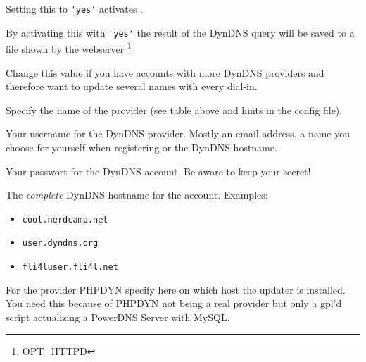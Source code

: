 \begin{description}


    {Setting this to \verb*?'yes'? activates .}


	{By activating this with \verb*?'yes'? the result of the DynDNS query 
	will be saved to a file shown by the webserver
	\footnote{OPT\_HTTPD}}


	{Change this value if you have accounts with more DynDNS providers 
	and therefore want to update several names with every dial-in.}


	{Specify the name of the provider (see table above and 
	hints in the config file).}


	{Your username for the DynDNS provider. Mostly an email address, 
	a name you choose for yourself when registering or the DynDNS hostname.}


	{Your passwort for the DynDNS account. Be aware to keep your secret!}


	{The \emph{complete} DynDNS hostname for the account. 
	Examples:

	\begin{itemize}
		\item \texttt{cool.nerdcamp.net}
		\item \texttt{user.dyndns.org}
		\item \texttt{fli4luser.fli4l.net}
	\end{itemize}

	}


	{For the provider PHPDYN specify here on which host the updater
	is installed. You need this because of PHPDYN not being a real 
	provider but only a gpl'd script actualizing a PowerDNS Server with 
	MySQL.
	}



\end{description}
